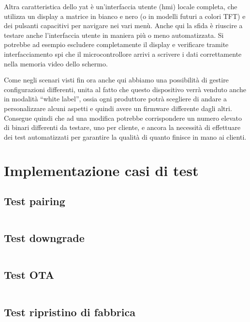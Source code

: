 \documentclass[12pt,a4paper,twoside,titlepage]{book}
\begin{document}
Altra caratteristica dello \acrshort{yat} è un'interfaccia utente (\acrshort{hmi})
locale completa, che utilizza un display a matrice in bianco e nero (o in modelli
futuri a colori TFT) e dei pulsanti capacitivi per navigare nei vari menù. Anche
qui la sfida è riuscire a testare anche l'interfaccia utente in maniera più o meno
automatizzata. Si potrebbe ad esempio escludere completamente il display e verificare
tramite interfacciamento \Gls{spi} che il microcontrollore arrivi a scrivere i dati correttamente
nella memoria video dello schermo.

Come negli scenari visti fin ora anche qui abbiamo una possibilità di gestire configurazioni
differenti, unita al fatto che questo dispositivo verrà venduto anche in modalità ``white label'',
ossia ogni produttore potrà scegliere di andare a personalizzare alcuni aspetti e quindi
avere un \gls{firmware} differente dagli altri. Consegue quindi che ad una modifica potrebbe
corrispondere un numero elevato di binari differenti da testare, uno per cliente, e
ancora la necessità di effettuare dei test automatizzati per garantire la qualità di
quanto finisce in mano ai clienti.

\appendix

\chapter{Implementazione casi di test}
\section{Test pairing}
\label{section:impl_test_pairing}
\inputminted[]{python3}{src/test_pairing.py}

\section{Test downgrade}
\label{section:impl_test_downgrade}
\inputminted[]{python3}{src/test_downgrade.py}

\section{Test OTA}
\label{section:impl_test_ota}
\inputminted[]{python3}{src/test_ota.py}

\section{Test ripristino di fabbrica}
\label{section:impl_test_factory_reset}
\inputminted[]{python3}{src/test_factory_reset.py}
\end{document}
